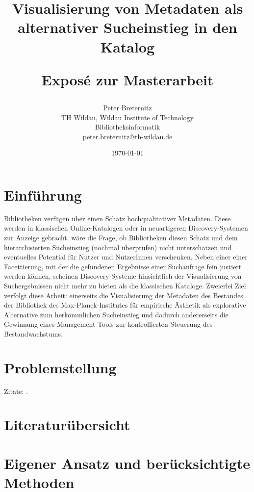 \documentclass[10pt,a4paper,twocolumn]{article}
\begin{document}
\title{{\bf Visualisierung von Metadaten als alternativer Sucheinstieg in den
        Katalog } \\ \begin{large}Exposé zur Masterarbeit                                                                             \end{large}}
\author{
	Peter Breternitz \\
	TH Wildau, Wildau Institute of Technology\\ Bibliotheksinformatik \\
	peter.breternitz@th-wildau.de
}
\date{\today}

\maketitle

\section{Einführung} 
Bibliotheken verfügen über einen Schatz hochqualitativer Metadaten. Diese
werden in klassischen Online-Katalogen oder in neuartigeren Discovery-Systemen
zur Anzeige gebracht. 
wäre die Frage, ob Bibliotheken diesen Schatz und dem hierarchisierten
Sucheinstieg (nochmal überprüfen) nicht unterschätzen und eventuelles
Potential für Nutzer und NutzerInnen verschenken. Neben einer 
einer Facettierung, mit der die gefundenen Ergebnisse einer Suchanfrage fein
justiert werden können, scheinen Discovery-Systeme hinsichtlich der Visualisierung von Suchergebnissen
nicht mehr zu bieten als die klassischen Kataloge. Zweierlei Ziel
verfolgt diese Arbeit: einerseits die Visualisierung der Metadaten des Bestandes
der Bibliothek des Max-Planck-Institutes für empirische Ästhetik als
explorative Alternative zum herkömmlichen Sucheinstieg und dadurch
andererseits die Gewinnung eines Management-Tools zur kontrollierten Steuerung
des Bestandwachstums. 

\section{Problemstellung} 
\blindtext
Zitate: \cite{Harrison75a, Harrison78a}.

\section{Literaturübersicht}

\blindtext
\section{Eigener Ansatz und berücksichtigte Methoden} 
\blindtext



 
\end{document}
